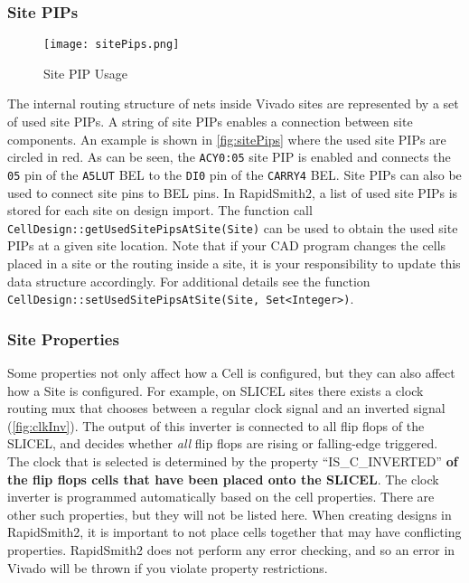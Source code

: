 \subsubsection{Site PIPs}
\begin{figure}[b!]
  \centering
  \texttt{[image: sitePips.png]}
  \caption{Site PIP Usage}
  \label{fig:sitePips}
\end{figure}

The internal routing structure of nets inside Vivado sites are represented by
a set of used site PIPs. A string of site PIPs enables a connection between site
components. An example is shown in \autoref{fig:sitePips} where the used site
PIPs are circled in red. As can be seen, the \texttt{ACY0:05} site PIP is
enabled and connects the \texttt{05} pin of the \texttt{A5LUT} BEL to the
\texttt{DI0} pin of the \texttt{CARRY4} BEL. Site PIPs can also be used to 
connect site pins to BEL pins. In RapidSmith2, a list of used site PIPs is
stored for each site on design import. The function call
\texttt{CellDesign::getUsedSitePipsAtSite(Site)} can be used to obtain the used
site PIPs at a given site location. Note that if your CAD program changes 
the cells placed in a site or the routing inside a site, it is your
responsibility to update this data structure accordingly.  For additional
details see the function \texttt{CellDesign::setUsedSitePipsAtSite(Site,
Set<Integer>)}.

\subsubsection{Site Properties}
Some properties not only affect how a Cell is configured, but they can also
affect how a Site is configured. For example, on SLICEL sites there exists a
clock routing mux that chooses between a regular clock signal and an inverted
signal (\autoref{fig:clkInv}). The output of this inverter is connected to all
flip flops of the SLICEL, and decides whether \textit{all} flip flops are
rising or falling-edge triggered. The clock that is selected is determined
by the property ``IS_C_INVERTED'' \textbf{of the flip flops cells that have been
placed onto the SLICEL}. The clock inverter is programmed automatically based on
the cell properties. There are other such properties, but they will not be listed
here. When creating designs in RapidSmith2, it is important to not place cells
together that may have conflicting properties. RapidSmith2 does not perform any
error checking, and so an error in Vivado will be thrown if you violate
property restrictions.

